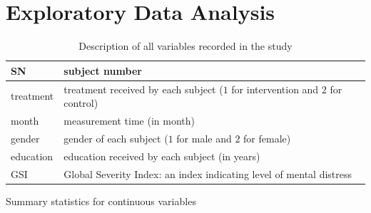 \section{Exploratory Data Analysis}

\begin{table}[H]
\centering
\begin{tabular}{|l|l|}
\hline
SN & subject number \\
\hline
treatment & treatment received by each subject ($1$ for intervention and $2$ for control)\\
\hline
month & measurement time (in month)\\
\hline
gender & gender of each subject ($1$ for male and $2$ for female)\\
\hline
education & education received by each subject (in years)\\
\hline
GSI & Global Severity Index: an index indicating level of mental distress\\
\hline
\end{tabular}
\caption{Description of all variables recorded in the study}
\label{tab:var.decription}
\end{table}

\begin{table}[H]
\begin{minipage}{0.5\textwidth}
\centering
{}
\caption{Summary statistics for continuous variables}
\label{tab:summ.stat.cont}
\end{minipage}
\hfill
\begin{minipage}{0.5\textwidth}
\centering
{}
\caption{Missing rates of all variables in the study}
\label{tab:missing.rate}
\end{minipage}
\end{table}

